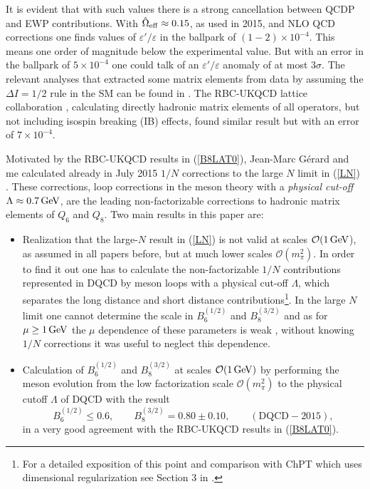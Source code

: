 \documentclass[12pt,a4paper]{article}
\newcommand{\ord}{\mathcal{O}}
\newcommand{\gev}{\, {\rm GeV}}
\newcommand{\bsi}{B_6^{(1/2)}}
\newcommand{\bei}{B_8^{(3/2)}}
\def\epe{\varepsilon'/\varepsilon}
\newcommand{\be}{\begin{equation}}
\newcommand{\ee}{\end{equation}}
\begin{document}
It is evident that with such values there is a strong cancellation
between QCDP and EWP contributions. With $\hat\Omega_{\rm eff}\approx 0.15$, as used in 2015, and NLO QCD corrections one finds values of $\epe$ in the ballpark of $(1-2)\times 10^{-4}$. This means one order of magnitude below the experimental value. But with an error in the ballpark of $5\times 10^{-4}$ one could talk of an $\epe$ anomaly of at most $3\sigma$.
The relevant analyses that extracted some matrix elements from data  by assuming the $\Delta I=1/2$ rule in the SM can be found in
\cite{Buras:2015yba,Kitahara:2016nld}. The RBC-UKQCD lattice collaboration \cite{Blum:2015ywa, Bai:2015nea}, calculating directly hadronic matrix elements of all operators, but not including isospin breaking (IB) effects, found similar result but with an error of
$7\times 10^{-4}$.

Motivated by the RBC-UKQCD results in (\ref{B8LAT0}), 
 Jean-Marc G{\'e}rard and me calculated already in July 2015 $1/N$ corrections to the large $N$ limit in  (\ref{LN}) \cite{Buras:2015xba}. These corrections, loop corrections in the meson theory with a {\em physical cut-off} $\Lambda\approx 0.7\gev$, are the leading non-factorizable corrections to hadronic matrix elements 
of $Q_6$ and $Q_8$. Two main results in this paper are:
\begin{itemize}
\item
  Realization that the large-$N$ result in (\ref{LN})
is not valid at scales $\ord(1\gev$), as
assumed in all papers before, but at much lower scales 
$\ord(m_\pi^2)$. In order to find it out one has to calculate the non-factorizable $1/N$ contributions represented in DQCD by  meson loops with a physical cut-off $\Lambda$, which separates the long distance and short distance contributions\footnote{For a detailed exposition of this point and comparison with ChPT
  which uses dimensional regularization see Section 3 in \cite{Buras:2014maa}.}. In 
the large $N$ limit one cannot determine the scale in $\bsi$ and $\bei$ and 
as for $\mu\ge 1\gev$ the $\mu$ dependence of these parameters is weak \cite{Buras:1993dy}, without
knowing $1/N$ corrections it was useful to neglect this dependence.
\item
Calculation of $\bsi$ and $\bei$ at scales $\ord(1\gev)$ by performing the meson evolution from  the low factorization scale $\ord(m_\pi^2)$ to the physical 
cutoff $\Lambda$ of DQCD with the result
\be\label{bsibei}
\bsi\le 0.6, \qquad \bei=0.80\pm 0.10,\qquad (\text{DQCD}-2015),
\ee
in a very good agreement with the RBC-UKQCD results in (\ref{B8LAT0}). 
\end{itemize}
\end{document}
